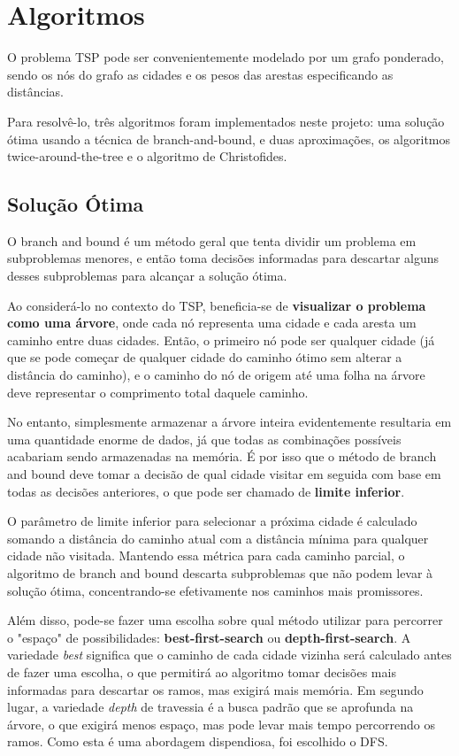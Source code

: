 \section{Algoritmos} \label{sec:algoritmos}

O problema TSP pode ser convenientemente modelado por um grafo ponderado, sendo os nós do grafo 
as cidades e os pesos das arestas especificando as distâncias.

Para resolvê-lo, três algoritmos foram implementados neste projeto: uma solução ótima usando 
a técnica de branch-and-bound, e duas aproximações, os algoritmos twice-around-the-tree e o 
algoritmo de Christofides.

\subsection{Solução Ótima} \label{sec:optimal_explanation}

O branch and bound é um método geral que tenta dividir um problema em subproblemas menores,
e então toma decisões informadas para descartar alguns desses subproblemas para alcançar a solução ótima.

Ao considerá-lo no contexto do TSP, beneficia-se de \textbf{visualizar o problema como uma árvore}, onde cada nó 
representa uma cidade e cada aresta um caminho entre duas cidades. Então, o primeiro nó pode ser qualquer cidade 
(já que se pode começar de qualquer cidade do caminho ótimo sem alterar a distância do caminho), e 
o caminho do nó de origem até uma folha na árvore deve representar o comprimento total 
daquele caminho.

No entanto, simplesmente armazenar a árvore inteira evidentemente resultaria em uma quantidade enorme 
de dados, já que todas as combinações possíveis acabariam sendo armazenadas na memória. É por isso que o 
método de branch and bound deve tomar a decisão de qual cidade visitar em seguida com base em todas as decisões 
anteriores, o que pode ser chamado de \textbf{limite inferior}.

O parâmetro de limite inferior para selecionar a próxima cidade é calculado somando a 
distância do caminho atual com a distância mínima para qualquer cidade não visitada. Mantendo essa métrica 
para cada caminho parcial, o algoritmo de branch and bound descarta subproblemas que não podem 
levar à solução ótima, concentrando-se efetivamente nos caminhos mais promissores.

Além disso, pode-se fazer uma escolha sobre qual método utilizar para percorrer o "espaço" de possibilidades: \textbf{best-first-search} ou \textbf{depth-first-search}. A variedade \textit{best} significa que o caminho de cada cidade vizinha será calculado antes de fazer uma escolha, o que permitirá ao algoritmo tomar decisões mais informadas para descartar os ramos, mas exigirá mais memória. Em segundo lugar, a variedade \textit{depth} de travessia é a busca padrão que se aprofunda na árvore, o que exigirá menos espaço, mas pode levar mais tempo percorrendo os ramos. Como esta é uma abordagem dispendiosa, foi escolhido o DFS.

